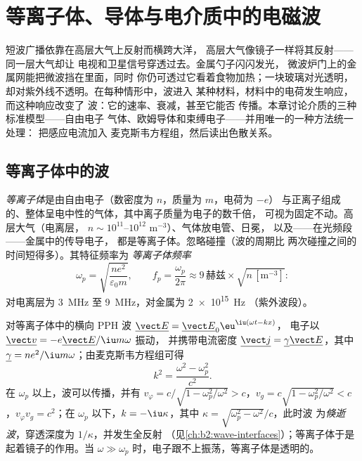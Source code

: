 \chapter{等离子体、导体与电介质中的电磁波}\label{ch:b2:waves-in-media}

短波广播依靠在高层大气上反射而横跨大洋，
高层大气像镜子一样将其反射——同一层大气却让
电视和卫星信号穿透过去。金属勺子闪闪发光，
微波炉门上的金属网能把微波挡在里面，同时
你仍可透过它看着食物加热；一块玻璃对光透明，
却对紫外线不透明。在每种情形中，波进入
某种材料，材料中的电荷发生响应，而这种响应改变了
波：它的速率、衰减，甚至它能否
传播。本章讨论介质的三种标准模型——自由电子
气体、欧姆导体和束缚电子——并用唯一的一种方法统一处理：
把感应电流加入
麦克斯韦方程组，然后读出色散关系。

\section{等离子体中的波}

\begin{definition}\label{def:b2:waves-in-media:plasma}
\emph{等离子体}是由自由电子（数密度为 $n$，质量为 $m$，电荷为 $-e$）
与正离子组成的、整体呈电中性的气体，其中离子质量为电子的数千倍，
可视为固定不动。高层大气（电离层，
$n \sim 10^{11}$--$10^{12}$ m$^{-3}$）、气体放电管、日冕，
以及——在光频段——金属中的传导电子，
都是等离子体。忽略碰撞（波的周期比
两次碰撞之间的时间短得多）。其特征频率为
\emph{等离子体频率}
\[
\omega_p = \sqrt{\frac{ne^2}{\varepsilon_0m}} , \qquad
f_p = \frac{\omega_p}{2\pi} \approx 9\,\text{赫兹}\times\sqrt{n\,[\text{m}^{-3}]} :
\]
对电离层为 \qty{3}{MHz} 至 \qty{9}{MHz}，对金属为 \qty{2e15}{Hz}
（紫外波段）。
\end{definition}

\begin{theorem}[等离子体的色散关系]\label{thm:b2:waves-in-media:plasmadispersion}
对等离子体中的横向 PPH 波 $\underline{\vect E} = \underline{\vect E}_0\eu^{\iu(\omega t - kx)}$，
电子以 $\underline{\vect v} = -e\underline{\vect E}/\iu m\omega$ 振动，
并携带电流密度 $\underline{\vect j} = \underline\gamma\underline{\vect E}$，其中
$\underline\gamma = ne^2/\iu m\omega$；由麦克斯韦方程组可得
\[
k^2 = \frac{\omega^2 - \omega_p^2}{c^2} .
\]
在 $\omega_p$ 以上，波可以传播，并有 $v_\varphi = c/\sqrt{1 - \omega_p^2/\omega^2}
> c$，$v_g = c\sqrt{1 - \omega_p^2/\omega^2} < c$，$v_\varphi v_g = c^2$；在
$\omega_p$ 以下，$k = -\iu\kappa$，其中 $\kappa = \sqrt{\omega_p^2 - \omega^2}/c$，此时波
为\emph{倏逝波}，穿透深度为 $1/\kappa$，并发生全反射
（见\cref{ch:b2:wave-interfaces}）；等离子体于是起着镜子的作用。当 $\omega
\gg \omega_p$ 时，电子跟不上振荡，等离子体是透明的。
\end{theorem}

